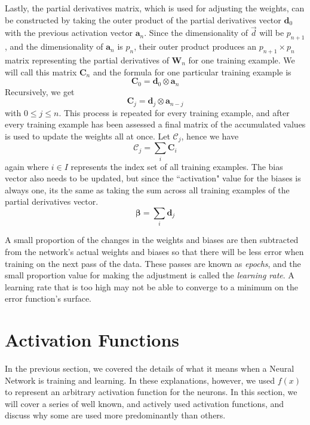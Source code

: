 \documentclass[12pt]{report}
\begin{document}
Lastly, the partial derivatives matrix, which is used for adjusting the weights, can be constructed by taking the outer product of the partial derivatives vector $\textbf{d}_0$ with the previous activation vector $\textbf{a}_n$. Since the dimensionality of $\vec{d}$ will be $p_{n+1}$, and the dimensionality of $\textbf{a}_n$ is $p_n$, their outer product produces an $p_{n+1} \times p_n$ matrix representing the partial derivatives of $\textbf{W}_n$ for one training example. We will call this matrix $\textbf{C}_n$ and the formula for one particular training example is
$$\textbf{C}_0 = \textbf{d}_0 \otimes \textbf{a}_n$$
Recursively, we get
$$\textbf{C}_j = \textbf{d}_j \otimes \textbf{a}_{n-j}$$
with $0 \leq j \leq n$.
This process is repeated for every training example, and after every training example has been assessed a final matrix of the accumulated values is used to update the weights all at once. Let $\mathscr{C}_j$, hence we have
$$\mathscr{C}_j = \sum_i \textbf{C}_i$$
again where $i \in I$ represents the index set of all training examples.
The bias vector also needs to be updated, but since the ``activation" value for the biases is always one, its the same as taking the sum across all training examples of the partial derivatives vector.
$$\boldsymbol{\beta} = \sum_i \textbf{d}_j$$

A small proportion of the changes in the weights and biases are then subtracted from the network's actual weights and biases so that there will be less error when training on the next pass of the data. These passes are known as \emph{epochs}, and the small proportion value for making the adjustment is called the \emph{learning rate}. A learning rate that is too high may not be able to converge to a minimum on the error function's surface.

\section{Activation Functions}
\label{section: activations}
In the previous section, we covered the details of what it means when a Neural Network is training and learning. In these explanations, however, we used $f(x)$ to represent an arbitrary activation function for the neurons. In this section, we will cover a series of well known, and actively used activation functions, and discuss why some are used more predominantly than others.
\end{document}
